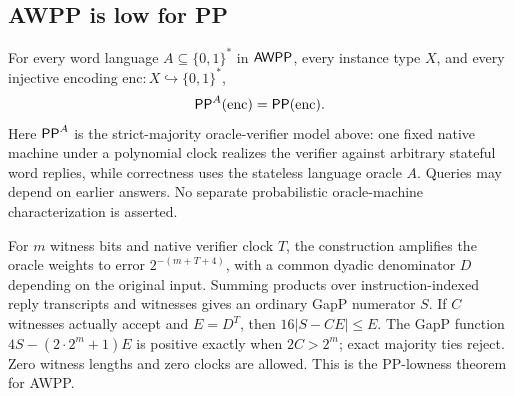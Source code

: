 \begin{result}
\subsection{AWPP is low for PP}
For every word language $A\subseteq\{0,1\}^*$ in $\mathsf{AWPP}$, every instance type $X$,
and every injective encoding $\mathrm{enc}:X\hookrightarrow\{0,1\}^*$,
\[
 \mathsf{PP}^{A}(\mathrm{enc})=\mathsf{PP}(\mathrm{enc}).
\]
Here $\mathsf{PP}^{A}$ is the strict-majority oracle-verifier model above: one fixed native
machine under a polynomial clock realizes the verifier against arbitrary stateful word
replies, while correctness uses the stateless language oracle $A$. Queries may depend on
earlier answers. No separate probabilistic oracle-machine characterization is asserted.

For $m$ witness bits and native verifier clock $T$, the construction amplifies the oracle
weights to error $2^{-(m+T+4)}$, with a common dyadic denominator $D$ depending on the
original input. Summing products over instruction-indexed reply transcripts and witnesses
gives an ordinary GapP numerator $S$. If $C$ witnesses actually accept and $E=D^T$, then
$16|S-CE|\leq E$. The GapP function $4S-(2\cdot2^m+1)E$ is positive exactly when
$2C>2^m$; exact majority ties reject. Zero witness lengths and zero clocks are allowed.
This is the PP-lowness theorem for AWPP.\citep{Fenner2003}
\end{result}

